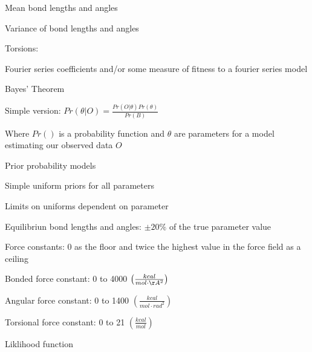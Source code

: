 \documentclass{report}
\begin{document}
\begin{outline}
\begin{outline}
\begin{outline}
\begin{outline}
\begin{outline}
          \item{Mean bond lengths and angles}
          \item{Variance of bond lengths and angles}
        \end{outline}
        \item{Torsions:}
        \begin{outline}
          \item{Fourier series coefficients and/or some measure of fitness to a fourier series model}
        \end{outline}
      \end{outline}
      \item{Bayes' Theorem}
      \begin{outline}
        \item{Simple version: $Pr\left(\theta|O\right) = \frac{Pr\left(O|\theta\right)Pr\left(\theta\right)}{Pr\left(B\right)}$}
        \item{Where $Pr\left(\right)$ is a probability function and $\theta$ are parameters for a model estimating our observed data $O$}
      \end{outline}
      \item{Prior probability models}
      \begin{outline}
        \item{Simple uniform priors for all parameters}
        \item{Limits on uniforms dependent on parameter}
        \begin{outline}
          \item{Equilibriun bond lengths and angles: $\pm 20\%$ of the true parameter value}
          \item{Force constants: 0 as the floor and twice the highest value in the force field as a ceiling}
          \begin{outline}
            \item{Bonded force constant: 0 to 4000 $\left(\frac{kcal}{mol \cdot \AA^2}\right)$}
            \item{Angular force constant: 0 to 1400 $\left(\frac{kcal}{mol \cdot rad^2}\right)$}
            \item{Torsional force constant: 0 to 21 $\left(\frac{kcal}{mol}\right)$}
          \end{outline}
        \end{outline}
      \end{outline}
      \item{Liklihood function}
      \begin{outline} 

\end{outline}
\end{outline}
\end{outline}
\end{outline}
\end{document}
